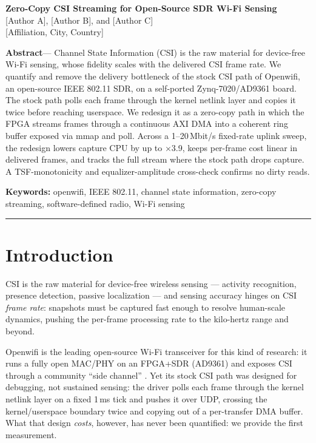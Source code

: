 \documentclass[10pt,a4paper]{article}
\begin{document}
\begin{center}
  {\LARGE\bfseries Zero-Copy CSI Streaming for Open-Source SDR Wi-Fi Sensing}\\[6pt]
  [Author A], [Author B], and [Author C]\\[2pt]
  {\small [Affiliation, City, Country]}
\end{center}

\vspace{2mm}
\noindent\textbf{Abstract}\hspace{0.5em}---\hspace{0.5em}
Channel State Information (CSI) is the raw material for device-free Wi-Fi
sensing, whose fidelity scales with the delivered CSI frame rate. We quantify
and remove the delivery bottleneck of the stock CSI path of Openwifi, an
open-source IEEE 802.11 SDR, on a self-ported Zynq-7020/AD9361 board. The
stock path polls each frame through the kernel netlink layer and copies it
twice before reaching userspace. We redesign it as a zero-copy path in which
the FPGA streams frames through a continuous AXI DMA into a coherent ring
buffer exposed via mmap and poll. Across a 1--20\,Mbit/s fixed-rate uplink
sweep, the redesign lowers capture CPU by up to $\times$3.9, keeps per-frame
cost linear in delivered frames, and tracks the full stream where the stock
path drops capture. A TSF-monotonicity and equalizer-amplitude cross-check
confirms no dirty reads.

\medskip
\noindent\textbf{Keywords:} openwifi, IEEE 802.11, channel state information,
zero-copy streaming, software-defined radio, Wi-Fi sensing

\vspace{2mm}
\hrule
\vspace{3mm}

\section{Introduction}

CSI is the raw material for device-free wireless sensing --- activity
recognition, presence detection, passive localization --- and sensing accuracy
hinges on CSI \emph{frame rate}: snapshots must be captured fast enough to
resolve human-scale dynamics, pushing the per-frame processing rate to the
kilo-hertz range and beyond.

Openwifi is the leading open-source Wi-Fi transceiver for this kind of
research: it runs a fully open MAC/PHY on an FPGA+SDR (AD9361) and exposes CSI
through a community ``side channel'' \cite{openwifi}. Yet its stock CSI path
was designed for debugging, not sustained sensing: the driver polls each frame
through the kernel netlink layer on a fixed 1\,ms tick and pushes it over UDP,
crossing the kernel/userspace boundary twice and copying out of a per-transfer
DMA buffer. What that design \emph{costs}, however, has never been quantified:
we provide the first measurement.
\end{document}
